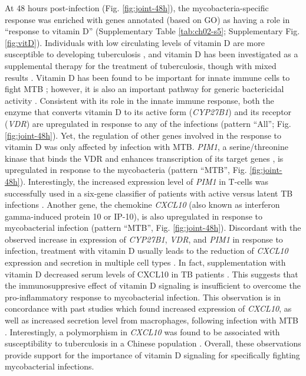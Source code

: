 At 48 hours post-infection (Fig. \ref{fig:joint-48h}), the
mycobacteria-specific response was enriched with genes annotated
(based on GO) as having a role in ``response to vitamin D''
(Supplementary Table \ref{tab:ch02-s5}; Supplementary
Fig. \ref{fig:vitD}). Individuals with low circulating levels of
vitamin D are more susceptible to developing tuberculosis
\citep{Zodpey2007, Nnoaham2008}, and vitamin D has been investigated
as a supplemental therapy for the treatment of tuberculosis, though
with mixed results \citep{Martineau2007, Lucas2014, Xia2014,
  Kearns2015}. Vitamin D has been found to be important for innate
immune cells to fight MTB \citep{Liu2006, Verway2013, Xu2014};
however, it is also an important pathway for generic bactericidal
activity \citep{Hewison2011}. Consistent with its role in the innate
immune response, both the enzyme that converts vitamin D to its active
form (\emph{CYP27B1}) and its receptor (\emph{VDR}) are upregulated in
response to any of the infections (pattern ``All'';
Fig. \ref{fig:joint-48h}). Yet, the regulation of other genes involved
in the response to vitamin D was only affected by infection with MTB.
\emph{PIM1}, a serine/threonine kinase that binds the VDR and enhances
transcription of its target genes \citep{Maier2012}, is upregulated in
response to the mycobacteria (pattern ``MTB'',
Fig. \ref{fig:joint-48h}). Interestingly, the increased expression
level of \emph{PIM1} in T-cells was successfully used in a six-gene
classifier of patients with active versus latent TB infections
\citep{Jacobsen2011}. Another gene, the chemokine \emph{CXCL10} (also
known as interferon gamma-induced protein 10 or IP-10), is also
upregulated in response to mycobacterial infection (pattern ``MTB'',
Fig. \ref{fig:joint-48h}). Discordant with the observed increase in
expression of \emph{CYP27B1}, \emph{VDR}, and \emph{PIM1} in response
to infection, treatment with vitamin D usually leads to the reduction
of \emph{CXCL10} expression and secretion in multiple cell types
\citep{Gysemans2005, Adorini2005, Scolletta2013}. In fact,
supplementation with vitamin D decreased serum levels of CXCL10 in TB
patients \citep{Coussens2012}. This suggests that the immunosuppresive
effect of vitamin D signaling is insufficient to overcome the
pro-inflammatory response to mycobacterial infection. This observation
is in concordance with past studies which found increased expression
of \emph{CXCL10}, as well as increased secretion level from
macrophages, following infection with MTB \citep{Zhu2006,
  Verway2013}. Interestingly, a polymorphism in \emph{CXCL10} was
found to be associated with susceptibility to tuberculosis in a
Chinese population \citep{Tang2009, Azad2012}. Overall, these
observations provide support for the importance of vitamin D signaling
for specifically fighting mycobacterial infections.

